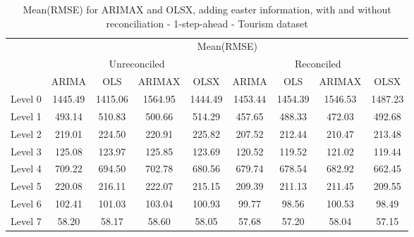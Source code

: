 \documentclass[11pt,a4paper,]{article}
\begin{document}
\begin{table}[t]

\caption{\label{tab:easterroolingRMSE}Mean(RMSE) for ARIMAX and OLSX, adding easter information, with and without reconciliation - 1-step-ahead - Tourism dataset}
\centering
\begin{tabular}{ccccccccc}
\toprule
\multicolumn{1}{c}{} & \multicolumn{8}{c}{Mean(RMSE)} \\
\cmidrule(l{3pt}r{3pt}){2-9}
\multicolumn{1}{c}{} & \multicolumn{4}{c}{Unreconciled} & \multicolumn{4}{c}{Reconciled} \\
\cmidrule(l{3pt}r{3pt}){2-5} \cmidrule(l{3pt}r{3pt}){6-9}
 & ARIMA & OLS & ARIMAX & OLSX & ARIMA & OLS & ARIMAX & OLSX\\
\midrule
Level 0 & 1445.49 & 1415.06 & 1564.95 & 1444.49 & 1453.44 & 1454.39 & 1546.53 & 1487.23\\
Level 1 & 493.14 & 510.83 & 500.66 & 514.29 & 457.65 & 488.33 & 472.03 & 492.68\\
Level 2 & 219.01 & 224.50 & 220.91 & 225.82 & 207.52 & 212.44 & 210.47 & 213.48\\
Level 3 & 125.08 & 123.97 & 125.85 & 123.69 & 120.52 & 119.52 & 121.02 & 119.44\\
Level 4 & 709.22 & 694.50 & 702.78 & 680.56 & 679.74 & 678.54 & 682.92 & 662.45\\
Level 5 & 220.08 & 216.11 & 222.07 & 215.15 & 209.39 & 211.13 & 211.45 & 209.55\\
Level 6 & 102.41 & 101.03 & 103.04 & 100.93 & 99.77 & 98.56 & 100.53 & 98.49\\
Level 7 & 58.20 & 58.17 & 58.60 & 58.05 & 57.68 & 57.20 & 58.04 & 57.15\\
\bottomrule
\end{tabular}
\end{table}
\end{document}
